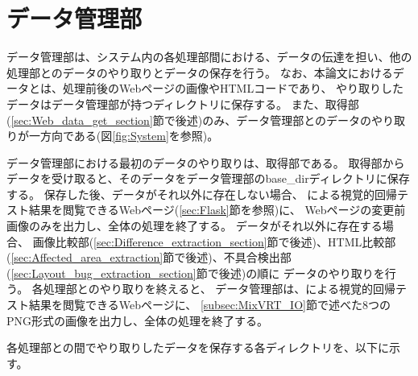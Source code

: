 \section{データ管理部}\label{sec:data_admin_section}
データ管理部は、システム内の各処理部間における、データの伝達を担い、他の処理部とのデータのやり取りとデータの保存を行う。
なお、本論文におけるデータとは、処理前後のWebページの画像やHTMLコードであり、
やり取りしたデータはデータ管理部が持つディレクトリに保存する。
また、取得部(\ref{sec:Web_data_get_section}節で後述)のみ、データ管理部とのデータのやり取りが一方向である(図\ref{fig:System}を参照)。
\par
データ管理部における最初のデータのやり取りは、取得部である。
取得部からデータを受け取ると、そのデータをデータ管理部のbase\_dirディレクトリに保存する。
保存した後、データがそれ以外に存在しない場合、
\toolName による視覚的回帰テスト結果を閲覧できるWebページ(\ref{sec:Flask}節を参照)に、
Webページの変更前画像のみを出力し、全体の処理を終了する。
データがそれ以外に存在する場合、
画像比較部(\ref{sec:Difference_extraction_section}節で後述)、HTML比較部(\ref{sec:Affected_area_extraction}節で後述)、不具合検出部(\ref{sec:Layout_bug_extraction_section}節で後述)の順に
データのやり取りを行う。
各処理部とのやり取りを終えると、
データ管理部は、\toolName による視覚的回帰テスト結果を閲覧できるWebページに、
\ref{subsec:MixVRT_IO}節で述べた8つのPNG形式の画像を出力し、全体の処理を終了する。
\par
各処理部との間でやり取りしたデータを保存する各ディレクトリを、以下に示す。
